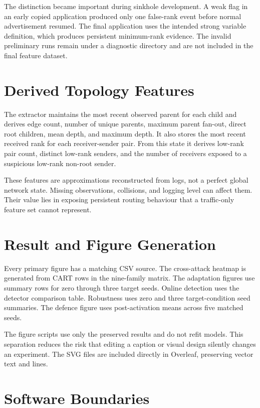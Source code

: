The distinction became important during sinkhole development. A weak flag in an early copied application produced only one false-rank event before normal advertisement resumed. The final application uses the intended strong variable definition, which produces persistent minimum-rank evidence. The invalid preliminary runs remain under a diagnostic directory and are not included in the final feature dataset.

\section{Derived Topology Features}

The extractor maintains the most recent observed parent for each child and derives edge count, number of unique parents, maximum parent fan-out, direct root children, mean depth, and maximum depth. It also stores the most recent received rank for each receiver-sender pair. From this state it derives low-rank pair count, distinct low-rank senders, and the number of receivers exposed to a suspicious low-rank non-root sender.

These features are approximations reconstructed from logs, not a perfect global network state. Missing observations, collisions, and logging level can affect them. Their value lies in exposing persistent routing behaviour that a traffic-only feature set cannot represent.

\section{Result and Figure Generation}

Every primary figure has a matching CSV source. The cross-attack heatmap is generated from CART rows in the nine-family matrix. The adaptation figures use summary rows for zero through three target seeds. Online detection uses the detector comparison table. Robustness uses zero and three target-condition seed summaries. The defence figure uses post-activation means across five matched seeds.

The figure scripts use only the preserved results and do not refit models. This separation reduces the risk that editing a caption or visual design silently changes an experiment. The SVG files are included directly in Overleaf, preserving vector text and lines.

\section{Software Boundaries}

